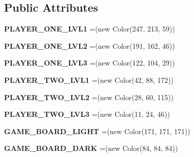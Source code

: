 \subsection*{Public Attributes}
\begin{DoxyCompactItemize}
\item 
\hypertarget{enumenums_1_1_taicho_colors_a1379a148fcf66a356fed51c0c0db0cae}{{\bfseries P\-L\-A\-Y\-E\-R\-\_\-\-O\-N\-E\-\_\-\-L\-V\-L1} =(new Color(247, 213, 59))}\label{enumenums_1_1_taicho_colors_a1379a148fcf66a356fed51c0c0db0cae}

\item 
\hypertarget{enumenums_1_1_taicho_colors_aaf1c3ddb1191b65ee35aafa4ea8fe94a}{{\bfseries P\-L\-A\-Y\-E\-R\-\_\-\-O\-N\-E\-\_\-\-L\-V\-L2} =(new Color(191, 162, 46))}\label{enumenums_1_1_taicho_colors_aaf1c3ddb1191b65ee35aafa4ea8fe94a}

\item 
\hypertarget{enumenums_1_1_taicho_colors_a83db7d971ec1bd06e8990767e3b541e3}{{\bfseries P\-L\-A\-Y\-E\-R\-\_\-\-O\-N\-E\-\_\-\-L\-V\-L3} =(new Color(122, 104, 29))}\label{enumenums_1_1_taicho_colors_a83db7d971ec1bd06e8990767e3b541e3}

\item 
\hypertarget{enumenums_1_1_taicho_colors_a61b7c5eeec1e4f27b09220b3ebf2326c}{{\bfseries P\-L\-A\-Y\-E\-R\-\_\-\-T\-W\-O\-\_\-\-L\-V\-L1} =(new Color(42, 88, 172))}\label{enumenums_1_1_taicho_colors_a61b7c5eeec1e4f27b09220b3ebf2326c}

\item 
\hypertarget{enumenums_1_1_taicho_colors_abed161a2885b6c9f6b66764a000817ca}{{\bfseries P\-L\-A\-Y\-E\-R\-\_\-\-T\-W\-O\-\_\-\-L\-V\-L2} =(new Color(28, 60, 115))}\label{enumenums_1_1_taicho_colors_abed161a2885b6c9f6b66764a000817ca}

\item 
\hypertarget{enumenums_1_1_taicho_colors_aab54b48abc8ca1ff383d17584c0495f8}{{\bfseries P\-L\-A\-Y\-E\-R\-\_\-\-T\-W\-O\-\_\-\-L\-V\-L3} =(new Color(11, 24, 46))}\label{enumenums_1_1_taicho_colors_aab54b48abc8ca1ff383d17584c0495f8}

\item 
\hypertarget{enumenums_1_1_taicho_colors_a14dabbd158f348b9fa2eeb5b90b59eb3}{{\bfseries G\-A\-M\-E\-\_\-\-B\-O\-A\-R\-D\-\_\-\-L\-I\-G\-H\-T} =(new Color(171, 171, 171))}\label{enumenums_1_1_taicho_colors_a14dabbd158f348b9fa2eeb5b90b59eb3}

\item 
\hypertarget{enumenums_1_1_taicho_colors_a244dad6522df6158c700e112f63fa074}{{\bfseries G\-A\-M\-E\-\_\-\-B\-O\-A\-R\-D\-\_\-\-D\-A\-R\-K} =(new Color(84, 84, 84))}\label{enumenums_1_1_taicho_colors_a244dad6522df6158c700e112f63fa074}


\end{DoxyCompactItemize}
